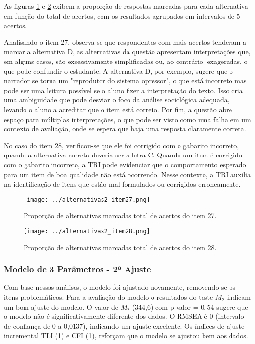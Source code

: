 As figuras \ref{fig:item_27} e \ref{fig:item_28} exibem a proporção de respostas marcadas para cada alternativa em função do total de acertos, com os resultados agrupados em intervalos de 5 acertos.

Analisando o item 27, observa-se que respondentes com mais acertos tenderam a marcar a alternativa D, as alternativas da questão apresentam interpretações que, em alguns casos, são excessivamente simplificadas ou, ao contrário, exageradas, o que pode confundir o estudante. A alternativa D, por exemplo, sugere que o narrador se torna um "reprodutor do sistema opressor", o que está incorreto mas pode ser uma leitura possível se o aluno fizer a interpretação do texto. Isso cria uma ambiguidade que pode desviar o foco da análise sociológica adequada, levando o aluno a acreditar que o item está correto. Por fim, a questão abre espaço para múltiplas interpretações, o que pode ser visto como uma falha em um contexto de avaliação, onde se espera que haja uma resposta claramente correta.
	
No caso do item 28, verificou-se que ele foi corrigido com o gabarito incorreto, quando a alternativa correta deveria ser a letra C. Quando um item é corrigido com o gabarito incorreto, a TRI pode evidenciar que o comportamento esperado para um item de boa qualidade não está ocorrendo. Nesse contexto, a TRI auxilia na identificação de itens que estão mal formulados ou corrigidos erroneamente.

\begin{figure}[H]
	\centering
	\texttt{[image: ../alternativas2\_item27.png]}
	\caption{Proporção de alternativas marcadas total de acertos do item 27.}
	\label{fig:item_27}
\end{figure}


\begin{figure}[H]
	\centering
	\texttt{[image: ../alternativas2\_item28.png]}
	\caption{Proporção de alternativas marcadas total de acertos do item 28.}
	\label{fig:item_28}
\end{figure}




\subsubsection{Modelo de 3 Parâmetros - 2º Ajuste}

 Com base nessas análises, o modelo foi ajustado novamente, removendo-se os itens problemáticos. Para a avaliação do modelo o resultados do teste $M_2$ indicam um bom ajuste do modelo. O valor de $M_2$ (344,6) com p-valor = $0,54$ sugere que o modelo não é significativamente diferente dos dados. O RMSEA é 0 (intervalo de confiança de 0 a 0,0137), indicando um ajuste excelente. Os índices de ajuste incremental TLI (1) e CFI (1), reforçam que o modelo se ajustou bem aos dados.
 
